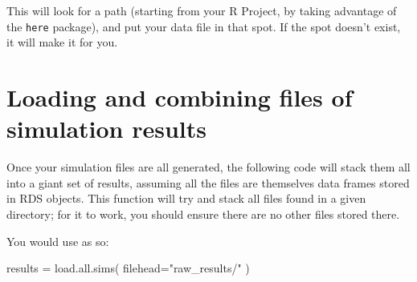 \documentclass[
]{book}
\newenvironment{Shaded}{\begin{snugshade}}{\end{snugshade}}
\newcommand{\AttributeTok}[1]{\textcolor[rgb]{0.77,0.63,0.00}{#1}}
\newcommand{\ConstantTok}[1]{\textcolor[rgb]{0.00,0.00,0.00}{#1}}
\newcommand{\ControlFlowTok}[1]{\textcolor[rgb]{0.13,0.29,0.53}{\textbf{#1}}}
\newcommand{\FunctionTok}[1]{\textcolor[rgb]{0.00,0.00,0.00}{#1}}
\newcommand{\NormalTok}[1]{#1}
\newcommand{\OtherTok}[1]{\textcolor[rgb]{0.56,0.35,0.01}{#1}}
\newcommand{\SpecialCharTok}[1]{\textcolor[rgb]{0.00,0.00,0.00}{#1}}
\newcommand{\StringTok}[1]{\textcolor[rgb]{0.31,0.60,0.02}{#1}}
\begin{document}
This will look for a path (starting from your R Project, by taking advantage of the \texttt{here} package), and put your data file in that spot.
If the spot doesn't exist, it will make it for you.

\hypertarget{loading-and-combining-files-of-simulation-results}{%
\section{Loading and combining files of simulation results}\label{loading-and-combining-files-of-simulation-results}}

Once your simulation files are all generated, the following code will stack them all into a giant set of results, assuming all the files are themselves data frames stored in RDS objects.
This function will try and stack all files found in a given directory; for it to work, you should ensure there are no other files stored there.

\begin{Shaded}
\end{Shaded}

You would use as so:

\begin{Shaded}
\begin{Highlighting}[]
\NormalTok{results }\OtherTok{=} \FunctionTok{load.all.sims}\NormalTok{( }\AttributeTok{filehead=}\StringTok{"raw\_results/"}\NormalTok{ )}
\end{Highlighting}
\end{Shaded}
\end{document}
